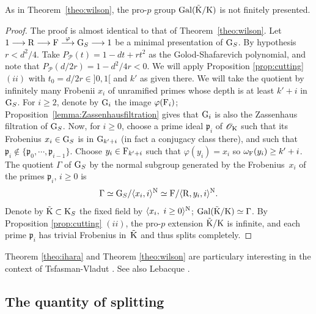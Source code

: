 \documentclass[12pt,a4paper,twoside,english]{smfart}
\def\p{{\mathfrak p}}
\def\R{{\rm R}}
\def\G{{\rm G}}
\def\K{{\rm K}}
\def\F{{\rm F}}
\def\O{{\mathcal O}}
\def\PP{{\mathcal P}}
\def\Gal{{\rm Gal}}
\begin{document}
\begin{rema}
As in Theorem~\ref{theo:wilson},  the pro-$p$ group $\Gal({\tilde \K}/\K)$ is not finitely presented.
\end{rema}


\begin{proof}
The proof is almost identical to that of Theorem~\ref{theo:wilson}.
Let $1\longrightarrow \R \longrightarrow \F \stackrel{\varphi}{\longrightarrow} \G_S \longrightarrow 1$ be a minimal presentation of $\G_S$.
By hypothesis 
$r<d^2/4$. 
  Take $P_{\PP}(t)=1-dt+rt^2$ as the Golod-Shafarevich polynomial, and note that $P_{\PP}(d/2r)=1-d^2/4r <0$.
   We will apply Proposition \ref{prop:cutting} $(ii)$ with $t_0=d/2r \in ]0,1[$ and $k'$ as given there. We will take the quotient by infinitely many Frobenii $x_i$
   of unramified primes whose depth is at least $k'+i$ in $\G_S$.
For $i\geq 2$, denote by $\G_i$ the image $\varphi(\F_i)$;  Proposition~\ref{lemma:Zassenhausfiltration} gives that  $\G_i$ is also the Zassenhaus filtration of $\G_S$.
Now, for $i \geq 0$,  choose a prime ideal $\p_i$ of $\O_\K$ such that  its Frobenius $x_i \in \G_S$ is  in  $\G_{k'+i}$  (in fact a conjugacy class there), and such that $\p_i\notin \{\p_0, \cdots, \p_{i-1}\}$. Choose $y_i\in \F_{k'+i}$ such that $\varphi(y_i)=x_i$
so 
$\omega_\F(y_i) \geq k'+i$.  
The quotient $\Gamma$ of $\G_S$ by the normal subgroup generated by the Frobenius~$x_i$ of the primes $\p_i$, $i\geq 0$ is 
$$\Gamma \simeq \G_S/\langle x_i, i \rangle^{\rm N} \simeq \F/\langle \R,y_i, i \rangle^{\rm N}.$$
Denote by ${\tilde \K} \subset \K_S$ the fixed field by $\langle x_i,\ i\geq 0 \rangle^{\rm N}$; $\Gal({\tilde \K}/\K) \simeq \Gamma$. By Proposition \ref{prop:cutting} $(ii)$, the pro-$p$ extension ${\tilde \K}/\K$ is infinite, and
each prime $\p_i$ has trivial Frobenius in~${\tilde \K}$ and thus splits completely.
\end{proof}


\begin{rema}
Theorem \ref{theo:ihara} and Theorem \ref{theo:wilson} are particulary interesting in the context of Tsfasman-Vladut  \cite{TV}. See also Lebacque \cite{Lebacque}.
\end{rema}






\subsection{The quantity of splitting}
\end{document}
